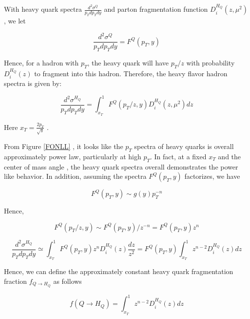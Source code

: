 With heavy quark spectra $ \frac{d^2\sigma^Q}{p_T dp_T dy}$ and parton fragmentation function $D_{i}^{H_Q}(z,\mu^2)$, we let


\begin{equation}
 \frac{d^2\sigma^Q}{p_T dp_T dy} = F^Q(p_T, y)
\end{equation}


Hence, for a hadron with $p_T$, the heavy quark will have $p_T/z$ with probability $D^{H_Q}_{i}(z)$ to fragment into this hadron. Therefore, the heavy flavor hadron spectra is given by:

\begin{equation}
\frac{d^2\sigma^{H_Q}}{p_T dp_T dy} = \int_{x_T}^1 F^Q(p_T/z, y) D_{i}^{H_Q}(z,\mu^2) dz
\end{equation}

Here $x_T = \frac{2p_T}{\sqrt s}$ \cite{HadronScale}.







\iffalse



From Figure \ref{FONLL} , it looks like the $p_T$ spectra of heavy quarks is overall approximately power law, particularly at high $p_T$. In fact, at a fixed $x_T$ and the center of mass angle \cite{HadronScale}, the heavy quark spectra overall demonstrates the power like behavior. In addition, assuming the spectra $F^Q(p_T,y)$ factorizes, we have
 

\begin{equation}
F^Q(p_T, y) \sim g(y) p_T^{-n}
\end{equation}

Hence,

\begin{equation}
F^Q(p_T/z, y) \sim F^Q(p_T, y)/z^{-n} = F^Q(p_T, y) z^n
\end{equation}


\begin{equation}
\frac{d^2\sigma^{H_Q}}{p_T dp_Tdy} \simeq \int_{x_T}^1 F^Q(p_T, y)  z^{n} D^{H_Q}_{i}(z) \frac{dz}{z^2} =F^Q(p_T, y)  \int_{x_T}^1  z^{n-2} D^{H_Q}_{i}(z) dz
\end{equation}



Hence, we can define the approximately constant heavy quark fragmentation fraction $f_{Q \rightarrow H_Q}$ as follows

\begin{equation}
f(Q \rightarrow H_Q) = \int_{x_T}^1 z^{n-2} D^{H_Q}_{i}(z) dz
\end{equation}

